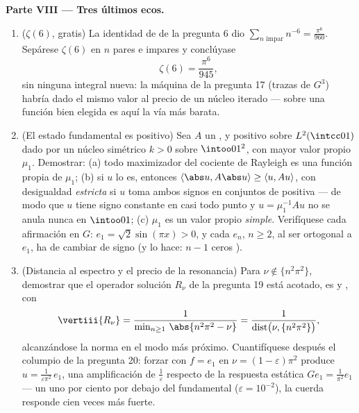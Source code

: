 \begin{problem}
\medskip
\noindent\textbf{Parte VIII --- Tres últimos ecos.}
\begin{enumerate}[resume]
  \item ($\zeta(6)$, gratis) La identidad de
   de la pregunta 6 dio
  $\sum_{n\text{ impar}}n^{-6} =
        \frac{\pi^6}{960}$. Sepárese $\zeta(6)$ en $n$ pares e impares y
  conclúyase
        \[
        \zeta(6) = \frac{\pi^6}{945},
        \]
        sin ninguna integral nueva: la máquina de la pregunta 17 (trazas
        de $G^3$) habría dado el mismo valor al precio de un núcleo
        iterado ---  sobre una
        función bien elegida es aquí la vía más barata. \item (El estado
        fundamental es positivo) Sea $A$ un ,
         y positivo
        sobre $L^2(\intcc01)$ dado por un núcleo simétrico
         $k > 0$ sobre
        $\intoo01^2$, con mayor valor propio $\mu_1$. Demostrar: (a)
        todo maximizador del cociente de Rayleigh es una función propia
        de $\mu_1$; (b) si $u$ lo es, entonces
        $\langle\abs u, A\abs u\rangle \geq \langle u,
        Au\rangle$, con desigualdad \emph{estricta} si $u$ toma ambos
        signos en conjuntos de 
        positiva --- de modo que $u$ tiene signo constante en casi todo
        punto y $u = \mu_1^{-1}Au$ no se anula nunca en $\intoo01$; (c)
        $\mu_1$ es un valor propio \emph{simple}. Verifíquese cada
        afirmación en $G$: $e_1 = \sqrt2\sin(\pi x) > 0$, y cada $e_n$,
        $n
        \geq 2$, al ser ortogonal a $e_1$, ha de cambiar de signo (y lo
        hace: $n - 1$ ceros
        ). \item (Distancia
        al espectro y el precio de la resonancia) Para
        $\nu \notin \{n^2\pi^2\}$, demostrar que el operador solución
        $R_\nu$ de la pregunta 19 está acotado, es
         y
        , con
        \[
        \vertiii{R_\nu} =
        \frac1{\min_{n\geq1}\,\abs{n^2\pi^2 - \nu}}
        = \frac1{\operatorname{dist}\bigl(\nu,
        \{n^2\pi^2\}\bigr)},
        \]
        alcanzándose la norma en el modo más próximo. Cuantifíquese
        después el columpio de la pregunta 20: forzar con $f = e_1$ en
        $\nu = (1 - \varepsilon)\pi^2$ produce $u =
        \frac{1}{\varepsilon\pi^2}\,e_1$, una amplificación de
        $\frac1\varepsilon$ respecto de la respuesta estática $Ge_1 =
        \frac1{\pi^2}e_1$ --- un uno por ciento por debajo del
        fundamental ($\varepsilon = 10^{-2}$), la cuerda responde cien
        veces más fuerte.
\end{enumerate}
\end{problem}
